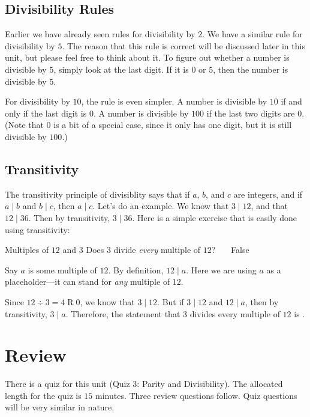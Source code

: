 \documentclass[a4paper,10pt]{report}
\begin{document}
\subsection{Divisibility Rules}

Earlier we have already seen rules for divisibility by $2$. We have a similar
rule for divisibility by $5$. The reason that this rule is correct will be
discussed later in this unit, but please feel free to think about it. To figure
out whether a number is divisible by $5$, simply look at the last digit. If it
is $0$ or $5$, then the number is divisible by $5$.

For divisibility by $10$, the rule is even simpler. A number is divisible by
$10$ if and only if the last digit is $0$. A number is divisible by $100$ if the
last two digits are $0$. (Note that $0$ is a bit of a special case, since it
only has one digit, but it is still divisible by $100$.)

\subsection{Transitivity}

The \gls{transitivity} principle of divisiblity says that if $a$, $b$, and $c$
are integers, and if $a \mid b$ and $b \mid c$, then $a \mid c$. Let's do an
example. We know that $3 \mid 12$, and that $12 \mid 36$. Then by transitivity,
$3 \mid 36$. Here is a simple exercise that is easily done using transitivity:

\begin{problem}{Multiples of $12$ and $3$}
 Does $3$ divide \emph{every} multiple of $12$? \hfill {}~~~False

 \begin{solution}
  Say $a$ is some multiple of $12$. By definition, $12 \mid a$. Here we are
  using $a$ as a placeholder---it can stand for \emph{any} multiple of $12$.

  Since $12 \div 3 = 4 \operatorname{R} 0$, we know that $3 \mid 12$. But if $3
  \mid 12$ and $12 \mid a$, then by transitivity, $3 \mid a$. Therefore, the
  statement that $3$ divides every multiple of $12$ is .
 \end{solution}
\end{problem}

\section{Review}

There is a quiz for this unit (Quiz 3: Parity and Divisibility). The allocated
length for the quiz is $15$ minutes. Three review questions follow. Quiz
questions will be very similar in nature.
\end{document}
